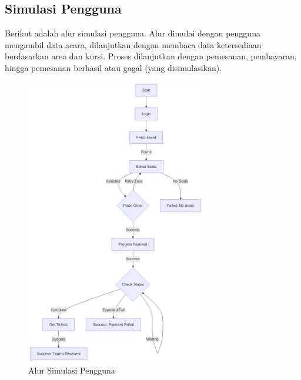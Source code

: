 \subsection{Simulasi Pengguna}

Berikut adalah alur simulasi pengguna. Alur dimulai dengan pengguna mengambil data acara, dilanjutkan dengan membaca data ketersediaan berdasarkan area dan kursi. Proses dilanjutkan dengan pemesanan, pembayaran, hingga pemesanan berhasil atau gagal (yang disimulasikan).

\begin{figure}[htbp]
    \centering
    \includegraphics[width=0.7\textwidth]{resources/chapter-3/user-flow.png}
    \caption{Alur Simulasi Pengguna}
    \label{fig:user-flow}
\end{figure}

\pagebreak